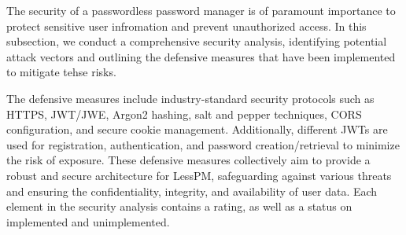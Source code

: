 The security of a passwordless password manager is of paramount importance to
protect sensitive user infromation and prevent unauthorized access.
In this subsection, we conduct a comprehensive security analysis, identifying
  potential attack vectors and outlining the defensive measures that have
  been implemented to mitigate tehse risks.

The defensive measures include industry-standard security protocols such as
  HTTPS, JWT/JWE, Argon2 hashing, salt and pepper techniques, CORS
  configuration, and secure cookie management.
Additionally, different JWTs are used for registration, authentication, and
  password creation/retrieval to minimize the risk of exposure.
These defensive measures collectively aim to provide a robust and secure
  architecture for LessPM, safeguarding against various threats and ensuring
  the confidentiality, integrity, and availability of user data.
Each element in the security analysis contains a rating, as well as a status
on implemented and unimplemented.
